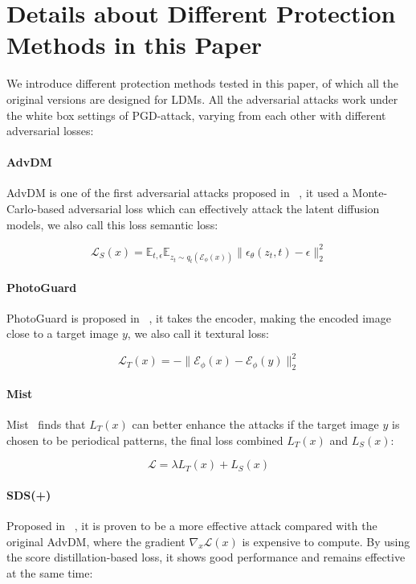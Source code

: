 \section{Details about Different Protection Methods in this Paper}
We introduce different protection methods tested in this paper, of which all the original versions are designed for LDMs. All the adversarial attacks work under the white box settings of PGD-attack, varying from each other with different adversarial losses:


\paragraph{AdvDM} AdvDM is one of the first adversarial attacks proposed in ~\cite{advdm}, it used a Monte-Carlo-based adversarial loss which can effectively attack the latent diffusion models, we also call this loss semantic loss:

\begin{equation}\label{appendix:semantic_loss}
        \mathcal{L}_{S}(x) = \mathbb{E}_{t, \epsilon} \mathbb{E}_{z_t \sim q_t(\mathcal{E}_{\phi}(x))}\|\epsilon_{\theta}(z_t, t) -\epsilon \|_2^2
\end{equation}


\paragraph{PhotoGuard} PhotoGuard is proposed in ~\cite{salman2023raising}, it takes the encoder, making the encoded image close to a target image $y$, we also call it textural loss:

\begin{equation}\label{appendix:tex-loss}
        \mathcal{L}_{T}(x) = -\|\mathcal{E}_{\phi}(x) -\mathcal{E}_{\phi}(y) \|_2^2
    \end{equation}

\paragraph{Mist} Mist~\cite{liang2023mist} finds that ${L}_{T}(x)$ can better enhance the attacks if the target image $y$ is chosen to be periodical patterns, the final loss combined ${L}_{T}(x)$ and ${L}_{S}(x)$:

\begin{equation}
    \mathcal{L} = \lambda {L}_{T}(x) + {L}_{S}(x)
\end{equation}

\paragraph{SDS(+)} Proposed in ~\cite{sdsattack}, it is proven to be a more effective attack compared with the original AdvDM, where the gradient $\nabla_x\mathcal{L}(x)$ is expensive to compute. By using the score distillation-based loss, it shows good performance and remains effective at the same time:

